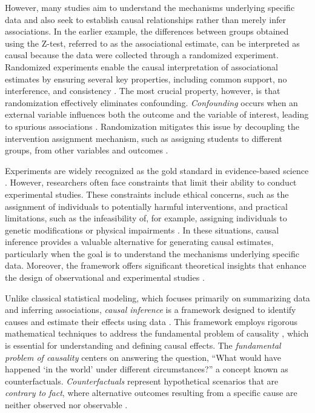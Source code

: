 \documentclass[
  authoryear,
  preprint,
  1p]{elsarticle}
\begin{document}
However, many studies aim to understand the mechanisms underlying
specific data and also seek to establish causal relationships rather
than merely infer associations. In the earlier example, the differences
between groups obtained using the Z-test, referred to as the
associational estimate, can be interpreted as causal because the data
were collected through a randomized experiment. Randomized experiments
enable the causal interpretation of associational estimates by ensuring
several key properties, including common support, no interference, and
consistency \citep{Morgan_et_al_2014, Neal_2020}. The most crucial
property, however, is that randomization effectively eliminates
confounding. \emph{Confounding} occurs when an external variable
influences both the outcome and the variable of interest, leading to
spurious associations \citep{Everitt_et_al_2010}. Randomization
mitigates this issue by decoupling the intervention assignment
mechanism, such as assigning students to different groups, from other
variables and outcomes \citep{Morgan_et_al_2014, Neal_2020}.

Experiments are widely recognized as the gold standard in evidence-based
science \citep{Hariton_et_al_2018, Hansson_2014}. However, researchers
often face constraints that limit their ability to conduct experimental
studies. These constraints include ethical concerns, such as the
assignment of individuals to potentially harmful interventions, and
practical limitations, such as the infeasibility of, for example,
assigning individuals to genetic modifications or physical impairments
\citep{Neal_2020}. In these situations, causal inference provides a
valuable alternative for generating causal estimates, particularly when
the goal is to understand the mechanisms underlying specific data.
Moreover, the framework offers significant theoretical insights that
enhance the design of observational and experimental studies
\citep{McElreath_2020}.

Unlike classical statistical modeling, which focuses primarily on
summarizing data and inferring associations, \emph{causal inference} is
a framework designed to identify causes and estimate their effects using
data \citep{Shaughnessy_et_al_2010, Neal_2020}. This framework employs
rigorous mathematical techniques to address the fundamental problem of
causality \citep{Pearl_2009}, which is essential for understanding and
defining causal effects. The \emph{fundamental problem of causality}
centers on answering the question, ``What would have happened `in the
world' under different circumstances?'' a concept known as
counterfactuals. \emph{Counterfactuals} represent hypothetical scenarios
that are \emph{contrary to fact}, where alternative outcomes resulting
from a specific cause are neither observed nor observable
\citep{Neal_2020, Counterfactual_2024}.
\end{document}
